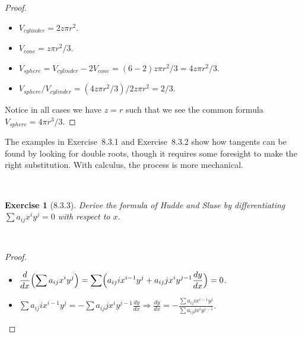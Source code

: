 \documentclass[12pt]{article}
\newcommand{\XB}{\color{black}}
\newcommand{\XBB}{\color{blue}}
\newcommand{\ds}{\displaystyle}
\theoremstyle{plain}
\newtheorem{ex}{Exercise}
\begin{document}
\begin{proof}
  \ \\

  \begin{itemize}
    \item $ \ds V_{cylinder} = 2z \pi r^{2}  $.
    \item $ \ds V_{cone} = z \pi r^{2} / 3 $.
    \item $ \ds V_{sphere} = V_{cylinder} - 2V_{cone} = (6 - 2) z \pi r^{2} / 3 = 4z \pi r^{2} / 3 $.
    \item $ \ds V_{sphere} / V_{cylinder} = (4z \pi r^{2} / 3) / 2z \pi r^{2} = 2 / 3 $.
  \end{itemize}

  Notice in all cases we have $ z = r $ such that we see the common formula $ \ds V_{sphere} = 4 \pi r^{3} / 3 $.
\end{proof}

\newpage

The examples in Exercise~8.3.1 and Exercise~8.3.2 show how tangents can be found by looking for double roots, though it requires some foresight to make the right substitution. With calculus, the process is more mechanical.


\XBB\hrulefill\XB \\
\begin{ex} [8.3.3]
  Derive the formula of Hudde and Sluse by differentiating $ \sum a_{ij} x^{i} y^{j} = 0 $ with respect to $ x $.
\end{ex}
\XBB\hrulefill\XB \\

\begin{proof}
  \ \\

  \begin{itemize}
    \item $ \ds \frac{d}{dx} \Bigl( \sum a_{ij} x^{i} y^{j} \Bigr) =  \sum \Bigl( a_{ij}i x^{i-1} y^{j} + a_{ij}j x^{i} y^{j-1} \frac{dy}{dx} \Bigr) = 0 $.
    \item $ \ds \sum a_{ij} i x^{i-1} y^{j} = -\sum a_{ij} j x^{i} y^{j-1} \frac{dy}{dx} \Rightarrow \frac{dy}{dx} = -\frac{\ds \sum a_{ij} i x^{i-1} y^{j}}{\ds \sum a_{ij} j x^{i} y^{j-1}}$.
  \end{itemize}

\end{proof}
\end{document}
